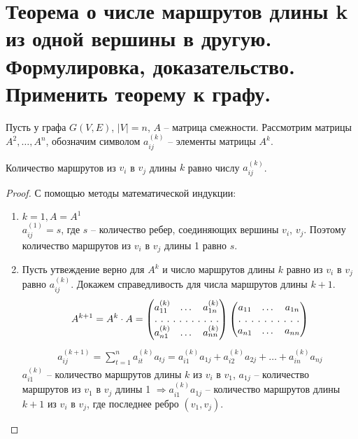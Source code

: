 \section{Теорема о числе маршрутов длины k из одной вершины в другую. Формулировка, 
доказательство. Применить теорему к графу.}

Пусть у графа $G(V,E)$, $|V|=n$, $A$ -- матрица смежности.
Рассмотрим матрицы $A^2,\dots,A^n$, обозначим символом $a_{ij}^{(k)}$ --
элементы матрицы $A^k$.

\begin{theorem}
    Количество маршрутов из $v_i$ в $v_j$ длины $k$ равно числу $a_{ij}^{(k)}$.
\end{theorem}

\begin{proof}
    С помощью методы математической индукции:
    \begin{enumerate}[left=0.0em, labelsep=1em, topsep=0.0em, itemsep=0pt, parsep=0.5em]
        \item $k=1, A=A^1$ \\
        $a_{ij}^{(1)} = s$, где $s$ -- количество ребер, соединяющих вершины $v_i$, $v_j$.
        Поэтому количество маршрутов из $v_i$ в $v_j$ длины 1 равно $s$.

        \item Пусть утвеждение верно для $A^k$ и число маршрутов длины $k$
        равно из $v_i$ в $v_j$ равно $a_{ij}^{(k)}$. Докажем справедливость
        для числа маршрутов длины $k+1$.
        \begin{align*}
            A^{k+1} = A^k \cdot A = 
            \begin{pmatrix}
                a_{11}^{(k)} & \dots & a_{1n}^{(k)}\\
                \hdotsfor[2]{3}\\
                a_{n1}^{(k)} & \dots & a_{nn}^{(k)}
            \end{pmatrix}
            \begin{pmatrix}
                a_{11} & \dots & a_{1n}\\
                \hdotsfor[2]{3}\\
                a_{n1} & \dots & a_{nn}
            \end{pmatrix}
        \end{align*}
        \begin{align*}
            a_{ij}^{(k+1)} = \sum_{t=1}^{n} a_{it}^{(k)}a_{tj}=
            a_{i1}^{(k)}a_{1j} + a_{i2}^{(k)}a_{2j} + \dots + a_{in}^{(k)}a_{nj}
        \end{align*}
        $a_{i1}^{(k)}$ -- количество маршрутов длины $k$ из $v_i$ в $v_1$, $a_{1j}$
        -- количество маршрутов из $v_1$ в $v_j$ длины 1 $\Rightarrow a_{i1}^{(k)}a_{1j}$
        -- количество маршрутов длины $k+1$ из $v_i$ в $v_j$, где последнее ребро $(v_1,v_j)$.
        

\end{enumerate}
\end{proof}
